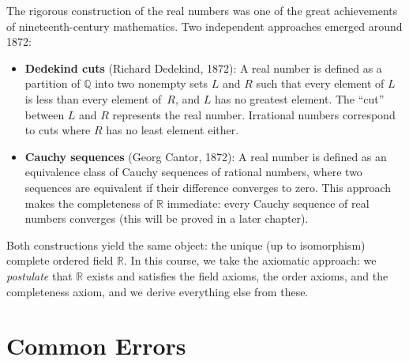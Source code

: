 \documentclass[12pt,a4paper,openany]{book}
\newcommand{\Q}{\mathbb{Q}}
\newcommand{\R}{\mathbb{R}}
\theoremstyle{definition}
\theoremstyle{remark}
\begin{document}
The rigorous construction of the real numbers was one of the great
achievements of nineteenth-century mathematics.  Two independent approaches
emerged around 1872:

\begin{itemize}
  \item \textbf{Dedekind cuts} (Richard Dedekind, 1872): A real number is
    defined as a partition of $\Q$ into two nonempty sets $L$ and $R$ such
    that every element of $L$ is less than every element of~$R$, and $L$ has
    no greatest element.  The ``cut'' between $L$ and $R$ represents the
    real number.  Irrational numbers correspond to cuts where $R$ has no
    least element either.

  \item \textbf{Cauchy sequences} (Georg Cantor, 1872): A real number is
    defined as an equivalence class of Cauchy sequences of rational numbers,
    where two sequences are equivalent if their difference converges to zero.
    This approach makes the completeness of $\R$ immediate: every Cauchy
    sequence of real numbers converges (this will be proved in a later
    chapter).
\end{itemize}

Both constructions yield the same object: the unique (up to isomorphism)
complete ordered field $\R$.  In this course, we take the axiomatic approach:
we \emph{postulate} that $\R$ exists and satisfies the field axioms, the
order axioms, and the completeness axiom, and we derive everything else from
these.

\section{Common Errors}
\label{sec:common-errors-ch2}
\end{document}
